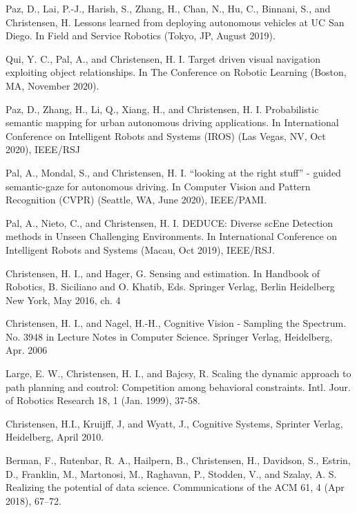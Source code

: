 \documentclass[svgnames,11pt]{article}
\begin{document}
\begin{bibenum}[itemsep=5pt]

\item Paz, D., Lai, P.-J., Harish, S., Zhang, H., Chan, N., Hu, C.,
  Binnani, S., and Christensen, H. Lessons learned from deploying
  autonomous vehicles at UC San Diego. In Field and Service Robotics
  (Tokyo, JP, August 2019).

\item Qui, Y. C., Pal, A., and Christensen, H. I. Target driven visual
  navigation exploiting object relationships. In The Conference on
  Robotic Learning (Boston, MA, November 2020).

\item  Paz, D., Zhang, H., Li, Q., Xiang, H., and Christensen, H. I.
  Probabilistic semantic mapping for urban autonomous driving
  applications. In International Conference on Intelligent Robots and
  Systems (IROS) (Las Vegas, NV, Oct 2020), IEEE/RSJ

\item Pal, A., Mondal, S., and Christensen, H. I. “looking at the
  right stuff” - guided semantic-gaze for autonomous driving. In
  Computer Vision and Pattern Recognition (CVPR) (Seattle, WA, June
  2020), IEEE/PAMI.

\item Pal, A., Nieto, C., and Christensen, H. I. DEDUCE: Diverse scEne
  Detection methods in Unseen Challenging Environments. In
  International Conference on Intelligent Robots and Systems (Macau,
  Oct 2019), IEEE/RSJ.
\end{bibenum}

\vspace{\baselineskip}

\vspace{\baselineskip}

\begin{bibenum}
\item Christensen, H. I., and Hager, G. Sensing and estimation. In
  Handbook of Robotics, B. Siciliano and O. Khatib, Eds. Springer
  Verlag, Berlin Heidelberg New York, May 2016, ch. 4
\item Christensen, H. I., and Nagel, H.-H., Cognitive Vision -
  Sampling the Spectrum. No. 3948 in Lecture Notes in Computer
  Science. Springer Verlag, Heidelberg, Apr. 2006
\item Large, E. W., Christensen, H. I., and Bajcsy, R. Scaling the
  dynamic approach to path planning and control: Competition among
  behavioral constraints. Intl. Jour. of Robotics Research 18, 1 (Jan.
  1999), 37-58.
\item Christensen, H.I., Kruijff, J, and Wyatt, J., Cognitive Systems,
  Sprinter Verlag, Heidelberg, April 2010.
\item Berman, F., Rutenbar, R. A., Hailpern, B., Christensen, H.,
  Davidson, S., Estrin, D., Franklin, M., Martonosi, M., Raghavan, P.,
  Stodden, V., and Szalay, A. S. Realizing the potential of data
  science. Communications of the ACM 61, 4 (Apr 2018), 67--72.

\end{bibenum}  
\end{document}
